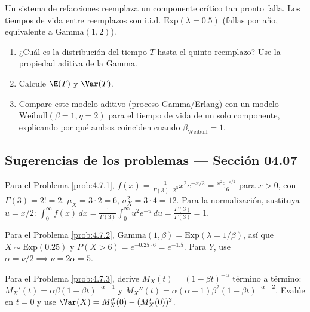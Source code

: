 \begin{problema}
	\label{prob:4.7.10}
	Un sistema de refacciones reemplaza un componente crítico tan pronto falla. Los tiempos de vida entre reemplazos son i.i.d. $\text{Exp}(\lambda=0.5)$ (fallas por año, equivalente a $\text{Gamma}(1,2)$).
	\begin{enumerate}
		\item ¿Cuál es la distribución del tiempo $T$ hasta el quinto reemplazo? Use la propiedad aditiva de la Gamma.
		\item Calcule $\E(T)$ y $\Var(T)$.
		\item Compare este modelo aditivo (proceso Gamma/Erlang) con un modelo $\text{Weibull}(\beta=1,\eta=2)$ para el tiempo de vida de un solo componente, explicando por qué ambos coinciden cuando $\beta_{\text{Weibull}}=1$.
	\end{enumerate}
\end{problema}

\subsection*{Sugerencias de los problemas --- Sección 04.07}

\begin{sugerencia}
	\label{sug:4.7.1}
	Para el Problema \ref{prob:4.7.1}, $f(x) = \frac{1}{\Gamma(3)\cdot 2^{3}}x^{2}e^{-x/2} = \frac{x^{2}e^{-x/2}}{16}$ para $x>0$, con $\Gamma(3)=2!=2$. $\mu_X = 3\cdot 2=6$, $\sigma_X^{2}=3\cdot 4=12$. Para la normalización, sustituya $u=x/2$: $\int_0^\infty f(x)\,dx = \frac{1}{\Gamma(3)}\int_0^\infty u^{2}e^{-u}\,du = \frac{\Gamma(3)}{\Gamma(3)}=1$.
\end{sugerencia}

\begin{sugerencia}
	\label{sug:4.7.2}
	Para el Problema \ref{prob:4.7.2}, $\text{Gamma}(1,\beta) = \text{Exp}(\lambda=1/\beta)$, así que $X \sim \text{Exp}(0.25)$ y $P(X>6)=e^{-0.25\cdot 6}=e^{-1.5}$. Para $Y$, use $\alpha=\nu/2 \implies \nu=2\alpha=5$.
\end{sugerencia}

\begin{sugerencia}
	\label{sug:4.7.3}
	Para el Problema \ref{prob:4.7.3}, derive $M_{X}(t)=(1-\beta t)^{-\alpha}$ término a término: $M_X'(t)=\alpha\beta(1-\beta t)^{-\alpha-1}$ y $M_X''(t)=\alpha(\alpha+1)\beta^{2}(1-\beta t)^{-\alpha-2}$. Evalúe en $t=0$ y use $\Var(X)=M_X''(0)-(M_X'(0))^{2}$.
\end{sugerencia}


